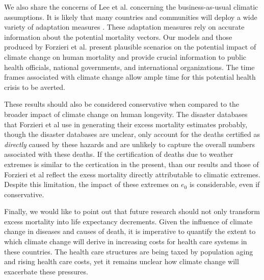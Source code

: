 \documentclass[12pt,]{article}
\begin{document}
We also share the concerns of Lee et al. \citep{lee2017comprehensive}
concerning the business-as-usual climatic assumptions. It is likely that
many countries and communities will deploy a wide variety of adaptation
measures \citep{haines2006climate, kovats2003methods, ebi2006approach}.
These adaptation measures rely on accurate information about the
potential mortality vectors. Our models and those produced by Forzieri
et al. \citep{forzieri2017increasing} present plausible scenarios on the
potential impact of climate change on human mortality and provide
crucial information to public health officials, national governments,
and international organizations. The time frames associated with climate
change allow ample time for this potential health crisis to be averted.

These results should also be considered conservative when compared to
the broader impact of climate change on human longevity. The disaster
databases that Forzieri et al \citep{forzieri2017increasing} use in
generating their excess mortality estimates probably, though the
disaster databases are unclear, only account for the deaths certified as
\emph{directly} caused by these hazards and are unlikely to capture the
overall numbers associated with these deaths. If the certification of
deaths due to weather extremes is similar to the certication in the
present, than our results and those of Forzieri et al reflect the exess
mortality directly attributable to climatic extremes. Despite this
limitation, the impact of these extremes on \(e_0\) is considerable,
even if conservative.

Finally, we would like to point out that future research should not only
transform excess mortality into life expectancy decrements. Given the
influence of climate change in diseases and causes of death, it is
imperative to quantify the extent to which climate change will derive in
increasing costs for health care systems in these countries. The health
care structures are being taxed by population aging
\citep{rechel2009can} and rising health care costs, yet it remains
unclear how climate change will exacerbate these pressures.

\newpage
\newpage
\singlespacing 

\end{document}
